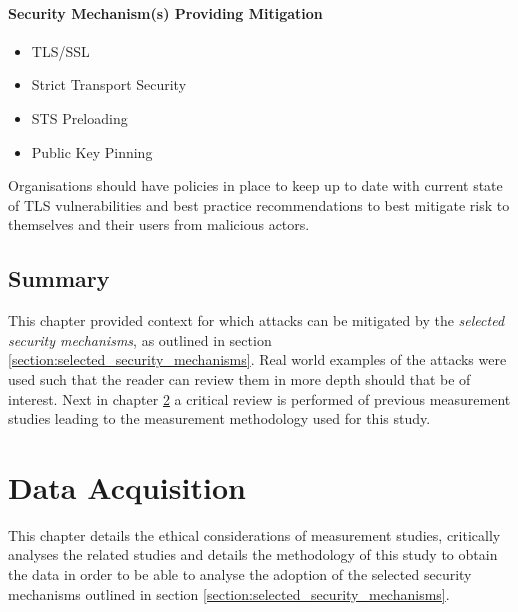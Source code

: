 \documentclass{mscreport}
\begin{document}
\subsubsection{Security Mechanism(s) Providing Mitigation}

\begin{itemize}
	\setlength\itemsep{0.1em}
	\item TLS/SSL
	\item Strict Transport Security
	\item STS Preloading
	\item Public Key Pinning
\end{itemize}

Organisations should have policies in place to keep up to date with current state of TLS vulnerabilities and best practice recommendations to best mitigate risk to themselves and their users from malicious actors.
\clearpage
\newpage

%


\section{Summary}

This chapter provided context for which attacks can be mitigated by the \textit{selected security mechanisms}, as outlined in section \ref{section:selected_security_mechanisms}. Real world examples of the attacks were used such that the reader can review them in more depth should that be of interest. Next in chapter \ref{chap:data_acqusition} a critical review is performed of previous measurement studies leading to the measurement methodology used for this study.


\chapter{Data Acquisition}
\label{chap:data_acqusition}

This chapter details the ethical considerations of measurement studies, critically analyses the related studies and details the methodology of this study to obtain the data in order to be able to analyse the adoption of the selected security mechanisms outlined in section \ref{section:selected_security_mechanisms}.
\end{document}
